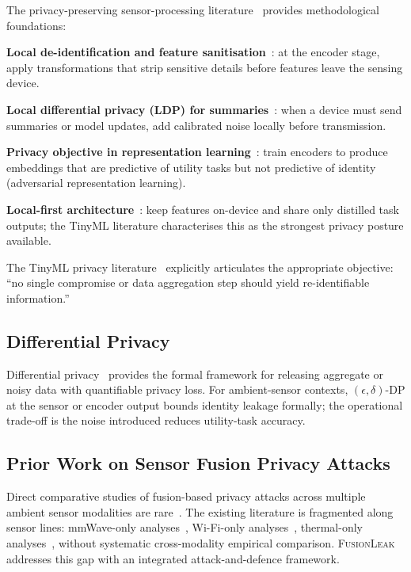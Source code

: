 \documentclass[sigconf,nonacm]{acmart}
\begin{document}
The privacy-preserving sensor-processing
literature~\cite{george2025tinyml,abadi2016deep,song2024neuralprivacy}
provides methodological foundations:

\textbf{Local de-identification and feature
sanitisation}~\cite{george2025tinyml}: at the encoder stage,
apply transformations that strip sensitive details before
features leave the sensing device.

\textbf{Local differential privacy (LDP) for
summaries}~\cite{george2025tinyml,abadi2016deep}: when a device
must send summaries or model updates, add calibrated noise locally
before transmission.

\textbf{Privacy objective in
representation learning}~\cite{george2025tinyml}: train encoders
to produce embeddings that are predictive of utility tasks but
not predictive of identity (adversarial representation
learning).

\textbf{Local-first architecture}~\cite{george2025tinyml}: keep
features on-device and share only distilled task outputs; the
TinyML literature characterises this as the strongest privacy
posture available.

The TinyML privacy
literature~\cite{george2025tinyml} explicitly articulates the
appropriate objective: ``no single compromise or data
aggregation step should yield re-identifiable information.''

\subsection{Differential Privacy}

Differential privacy~\cite{dwork2006dp,abadi2016deep}
provides the formal framework for releasing aggregate or noisy
data with quantifiable privacy loss. For ambient-sensor
contexts, $(\epsilon, \delta)$-DP at the sensor or encoder
output bounds identity leakage formally; the operational
trade-off is the noise introduced reduces utility-task
accuracy.

\subsection{Prior Work on Sensor Fusion Privacy Attacks}

Direct comparative studies of fusion-based privacy attacks
across multiple ambient sensor modalities are
rare~\cite{zhao2021reidtest,george2025tinyml}. The existing
literature is fragmented along sensor lines: mmWave-only
analyses~\cite{lu2019mid}, Wi-Fi-only analyses~\cite{rizk2025identifi,
armas2025ehunam}, thermal-only analyses~\cite{xie2024tadar},
without systematic cross-modality empirical comparison.
\textsc{FusionLeak} addresses this gap with an integrated
attack-and-defence framework.
\end{document}
